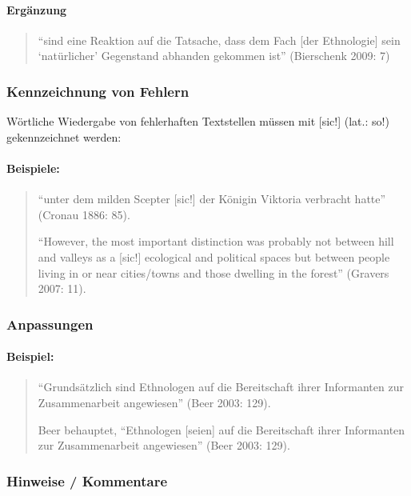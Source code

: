 \documentclass[ 12pt,
                titlepage,
                parskip=half,
                version=first,
                bibliography=totocnumbered,
                final,
                listof=totoc]{scrartcl}
\begin{document}
\paragraph{Ergänzung}
\begin{quote}
\enquote{sind eine Reaktion auf die Tatsache, dass dem Fach [der Ethnologie]
sein \enquote{natürlicher} Gegenstand abhanden gekommen ist}
(Bierschenk 2009: 7)
\end{quote}

\subsubsection{Kennzeichnung von Fehlern}

Wörtliche Wiedergabe von fehlerhaften Textstellen müssen mit [sic!] (lat.: so!)
gekennzeichnet werden:

\paragraph{Beispiele:}
\begin{quote}
\enquote{unter dem milden Scepter [sic!] der Königin Viktoria verbracht hatte}
(Cronau 1886: 85).

\enquote{However, the most important distinction was probably not between hill
and valleys as a [sic!] ecological and political spaces but between people
living in or near cities/towns and those dwelling in the forest} (Gravers 2007:
11).
\end{quote}

\subsubsection{Anpassungen}

\paragraph{Beispiel:}
\begin{quote}
\enquote{Grundsätzlich sind Ethnologen auf die Bereitschaft ihrer Informanten
zur Zusammenarbeit angewiesen} (Beer 2003: 129).

Beer behauptet, \enquote{Ethnologen [seien] auf die Bereitschaft ihrer
Informanten zur Zusammenarbeit angewiesen} (Beer 2003: 129).
\end{quote}

\subsubsection{Hinweise / Kommentare}
\end{document}

